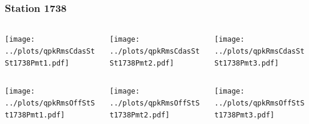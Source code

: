 \documentclass[aspectratio=169]{beamer}
\begin{document}
\begin{frame} 
  \frametitle{Station 1738}
  \begin{center}
    \begin{columns}
      \begin{column}{0.33\textwidth}
        \texttt{[image: ../plots/qpkRmsCdasStSt1738Pmt1.pdf]}
      \end{column}
      \begin{column}{0.33\textwidth}
        \texttt{[image: ../plots/qpkRmsCdasStSt1738Pmt2.pdf]}
      \end{column}
      \begin{column}{0.33\textwidth}
        \texttt{[image: ../plots/qpkRmsCdasStSt1738Pmt3.pdf]}
      \end{column}
    \end{columns}
  \end{center}

  \begin{center}
    \begin{columns}
      \begin{column}{0.33\textwidth}
        \texttt{[image: ../plots/qpkRmsOffStSt1738Pmt1.pdf]}
      \end{column}
      \begin{column}{0.33\textwidth}
        \texttt{[image: ../plots/qpkRmsOffStSt1738Pmt2.pdf]}
      \end{column}
      \begin{column}{0.33\textwidth}
        \texttt{[image: ../plots/qpkRmsOffStSt1738Pmt3.pdf]}
      \end{column}
    \end{columns}
  \end{center}
\end{frame}
\end{document}
